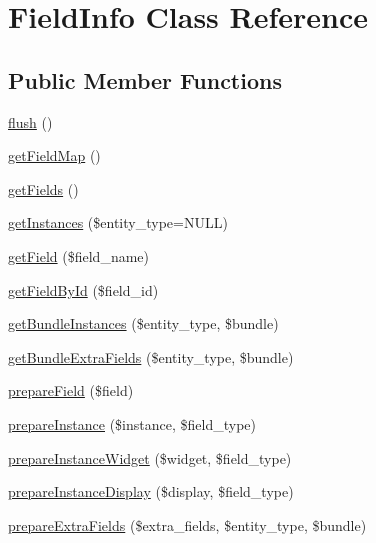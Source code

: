 \hypertarget{classFieldInfo}{
\section{FieldInfo Class Reference}
\label{classFieldInfo}
}
\subsection*{Public Member Functions}
\begin{DoxyCompactItemize}
\item 
\hyperlink{classFieldInfo_a54c9b362e943aa6d48f600f81bd8a22a}{flush} ()
\item 
\hyperlink{classFieldInfo_a626d055e692aad18ce67e2bc0dfa3b41}{getFieldMap} ()
\item 
\hyperlink{classFieldInfo_a5e817caa8f9c7fae505f9764ee676e0b}{getFields} ()
\item 
\hyperlink{classFieldInfo_af3f374479203c6cafc6ec01655e0df76}{getInstances} (\$entity\_\-type=NULL)
\item 
\hyperlink{classFieldInfo_ae9d200f6f749869b9e1011ac8cf641fa}{getField} (\$field\_\-name)
\item 
\hyperlink{classFieldInfo_a833bcc6b25c50126f5bf7f13d9a2226f}{getFieldById} (\$field\_\-id)
\item 
\hyperlink{classFieldInfo_a86592a2d5a38d0212d1fe66a3d09f279}{getBundleInstances} (\$entity\_\-type, \$bundle)
\item 
\hyperlink{classFieldInfo_a7dac2449d18bf1481651f12e357fc36e}{getBundleExtraFields} (\$entity\_\-type, \$bundle)
\item 
\hyperlink{classFieldInfo_a5fd135e121bf0e42cbb6a44e7a46a656}{prepareField} (\$field)
\item 
\hyperlink{classFieldInfo_a1880ecc9614a0af5d46110a20f799ac7}{prepareInstance} (\$instance, \$field\_\-type)
\item 
\hyperlink{classFieldInfo_a882515272656cf94dee3aa51acd2d21d}{prepareInstanceWidget} (\$widget, \$field\_\-type)
\item 
\hyperlink{classFieldInfo_a79100b16f20d8bc081e4108da2e714b6}{prepareInstanceDisplay} (\$display, \$field\_\-type)
\item 
\hyperlink{classFieldInfo_af1a6d10db6c9fc2d4942108edfd9c31f}{prepareExtraFields} (\$extra\_\-fields, \$entity\_\-type, \$bundle)
\end{DoxyCompactItemize}
